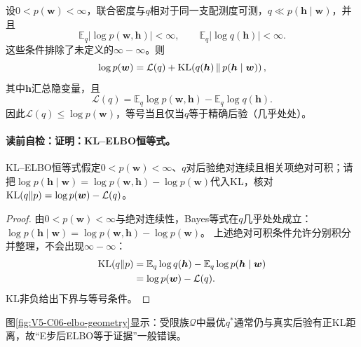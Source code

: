 \begin{theorem}[KL--ELBO恒等式]\label{thm:V5-C06-elbo}
设$0<p(\boldsymbol w)<\infty$，联合密度与$q$相对于同一支配测度可测，$q\ll p(\boldsymbol h\mid\boldsymbol w)$，并且
\[
\mathbb E_q\!\left|\log p(\boldsymbol w,\boldsymbol h)\right|<\infty,
\qquad
\mathbb E_q\!\left|\log q(\boldsymbol h)\right|<\infty.
\]
这些条件排除了未定义的$\infty-\infty$。则
\begin{equation}
\log p(\boldsymbol w)
=\mathcal L(q)+
\operatorname{KL}\!\left(q(\boldsymbol h)\,
\middle\|\,p(\boldsymbol h\mid\boldsymbol w)\right),
\label{eq:V5-C06-elbo-identity}
\end{equation}
其中$\boldsymbol h$汇总隐变量，且
\[
\mathcal L(q)=
\mathbb E_q\log p(\boldsymbol w,\boldsymbol h)
-\mathbb E_q\log q(\boldsymbol h).
\]
因此$\mathcal L(q)\le\log p(\boldsymbol w)$，等号当且仅当$q$等于精确后验（几乎处处）。
\end{theorem}
\paragraph{读前自检：证明：KL--ELBO恒等式。}KL--ELBO恒等式假定$0<p(\boldsymbol w)<\infty$、$q$对后验绝对连续且相关项绝对可积；请把$\log p(\boldsymbol h\mid\boldsymbol w)=\log p(\boldsymbol w,\boldsymbol h)-\log p(\boldsymbol w)$代入KL，核对$\operatorname{KL}(q\|p)=\log p(\boldsymbol w)-\mathcal L(q)$。\par

\begin{proof}
由$0<p(\boldsymbol w)<\infty$与绝对连续性，Bayes等式在$q$几乎处处成立：
$\log p(\boldsymbol h\mid\boldsymbol w)
=\log p(\boldsymbol w,\boldsymbol h)-\log p(\boldsymbol w)$。
上述绝对可积条件允许分别积分并整理，不会出现$\infty-\infty$：
\begin{align*}
\operatorname{KL}(q\|p)
&=\mathbb E_q\log q(\boldsymbol h)
-\mathbb E_q\log p(\boldsymbol h\mid\boldsymbol w)\\
&=\log p(\boldsymbol w)-\mathcal L(q).
\end{align*}
KL非负给出下界与等号条件。
\end{proof}

图\ref{fig:V5-C06-elbo-geometry}显示：受限族$\mathcal Q$中最优$q^*$通常仍与真实后验有正KL距离，故“E步后ELBO等于证据”一般错误。


